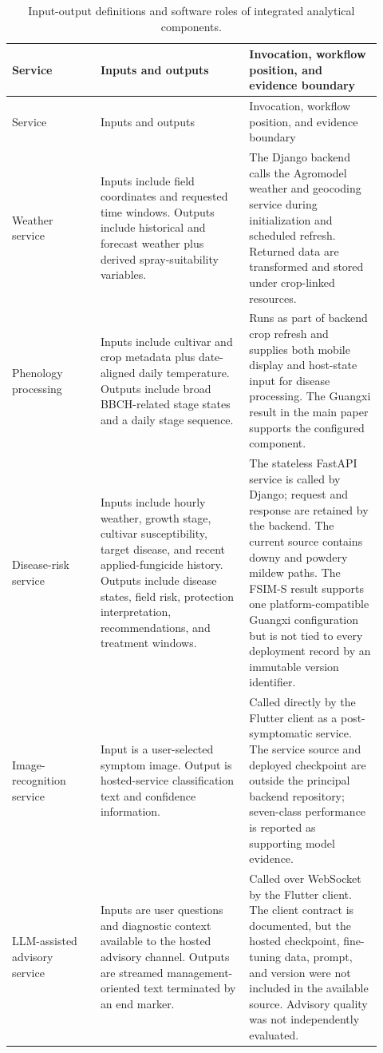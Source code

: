 \documentclass[12pt]{article}
\begin{document}
\begingroup
\setlength{\tabcolsep}{3pt}
\renewcommand{\arraystretch}{1.12}
\begin{longtable}{@{}L{0.22\linewidth} L{0.37\linewidth} L{0.33\linewidth}@{}}
\caption{Input-output definitions and software roles of integrated analytical components.}\label{tab:supp_module_details}\\
\toprule
Service & Inputs and outputs & Invocation, workflow position, and evidence boundary \\
\midrule
\endfirsthead
\toprule
Service & Inputs and outputs & Invocation, workflow position, and evidence boundary \\
\midrule
\endhead
Weather service & Inputs include field coordinates and requested time windows. Outputs include historical and forecast weather plus derived spray-suitability variables. & The Django backend calls the Agromodel weather and geocoding service during initialization and scheduled refresh. Returned data are transformed and stored under crop-linked resources. \\
Phenology processing & Inputs include cultivar and crop metadata plus date-aligned daily temperature. Outputs include broad BBCH-related stage states and a daily stage sequence. & Runs as part of backend crop refresh and supplies both mobile display and host-state input for disease processing. The Guangxi result in the main paper supports the configured component. \\
Disease-risk service & Inputs include hourly weather, growth stage, cultivar susceptibility, target disease, and recent applied-fungicide history. Outputs include disease states, field risk, protection interpretation, recommendations, and treatment windows. & The stateless FastAPI service is called by Django; request and response are retained by the backend. The current source contains downy and powdery mildew paths. The FSIM-S result supports one platform-compatible Guangxi configuration but is not tied to every deployment record by an immutable version identifier. \\
Image-recognition service & Input is a user-selected symptom image. Output is hosted-service classification text and confidence information. & Called directly by the Flutter client as a post-symptomatic service. The service source and deployed checkpoint are outside the principal backend repository; seven-class performance is reported as supporting model evidence. \\
LLM-assisted advisory service & Inputs are user questions and diagnostic context available to the hosted advisory channel. Outputs are streamed management-oriented text terminated by an end marker. & Called over WebSocket by the Flutter client. The client contract is documented, but the hosted checkpoint, fine-tuning data, prompt, and version were not included in the available source. Advisory quality was not independently evaluated. \\
\bottomrule
\end{longtable}
\endgroup
\end{document}
